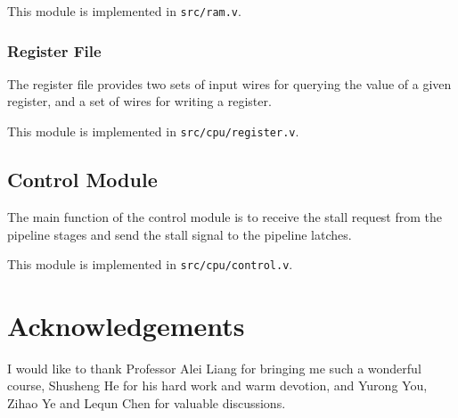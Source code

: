 \documentclass{article}
\begin{document}
This module is implemented in \texttt{src/ram.v}.

\subsubsection{Register File}
The register file provides two sets of input wires for querying the value of a given register, and a set of wires for writing a register.

This module is implemented in \texttt{src/cpu/register.v}.

\subsection{Control Module}
The main function of the control module is to receive the stall request from the pipeline stages and send the stall signal to the pipeline latches.

This module is implemented in \texttt{src/cpu/control.v}.

%
%



\section{Acknowledgements}
I would like to thank Professor Alei Liang for bringing me such a wonderful course, Shusheng He for his hard work and warm devotion, and Yurong You, Zihao Ye and Lequn Chen for valuable discussions.
\end{document}
